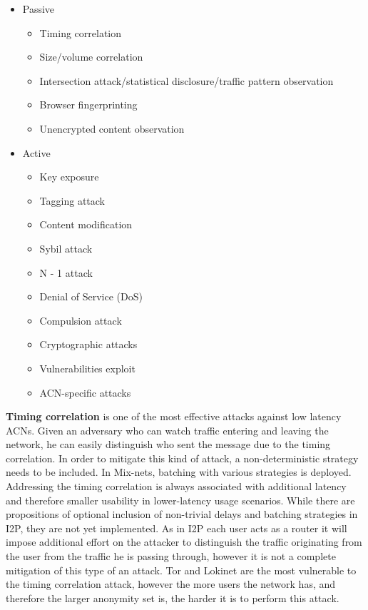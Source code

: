 \begin{itemize}
    \item Passive
    \begin{itemize}
        \item Timing correlation
        \item Size/volume correlation
        \item Intersection attack/statistical disclosure/traffic pattern observation
        \item Browser fingerprinting
        \item Unencrypted content observation
    \end{itemize}
    \item Active
    \begin{itemize}
        \item Key exposure
        \item Tagging attack
        \item Content modification
        \item Sybil attack
        \item N - 1 attack
        \item Denial of Service (DoS)
        \item Compulsion attack
        \item Cryptographic attacks
        \item Vulnerabilities exploit
        \item ACN-specific attacks
    \end{itemize}
\end{itemize}

\textbf{Timing correlation} is one of the most effective attacks against low latency ACNs. Given an adversary who can watch traffic entering and leaving the network, he can easily distinguish who sent the message due to the timing correlation. In order to mitigate this kind of attack, a non-deterministic strategy needs to be included. In Mix-nets, batching with various strategies is deployed. Addressing the timing correlation is always associated with additional latency and therefore smaller usability in lower-latency usage scenarios. While there are propositions of optional inclusion of non-trivial delays and batching strategies in I2P, they are not yet implemented. As in I2P each user acts as a router it will impose additional effort on the attacker to distinguish the traffic originating from the user from the traffic he is passing through, however it is not a complete mitigation of this type of an attack. Tor and Lokinet are the most vulnerable to the timing correlation attack, however the more users the network has, and therefore the larger anonymity set is, the harder it is to perform this attack.

